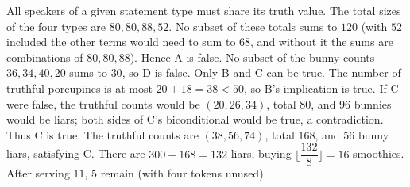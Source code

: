 All speakers of a given statement type must share its truth value. The total sizes of the four types are $80,80,88,52$. No subset of these totals sums to $120$ (with $52$ included the other terms would need to sum to $68$, and without it the sums are combinations of $80,80,88$). Hence A is false.
No subset of the bunny counts $36,34,40,20$ sums to $30$, so D is false. Only B and C can be true. The number of truthful porcupines is at most $20+18=38<50$, so B's implication is true. If C were false, the truthful counts would be $(20,26,34)$, total $80$, and $96$ bunnies would be liars; both sides of C's biconditional would be true, a contradiction. Thus C is true. The truthful counts are $(38,56,74)$, total $168$, and $56$ bunny liars, satisfying C. There are $300-168=132$ liars, buying $\lfloor\dfrac{132}{8}\rfloor=16$ smoothies. After serving $11$, $\boxed5$ remain (with four tokens unused).
